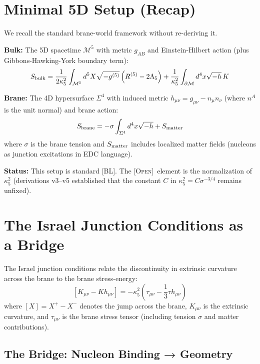 \documentclass[11pt,a4paper]{article}
\newcommand{\BL}{\textsc{[BL]}}
\newcommand{\Open}{\textsc{[Open]}}
\begin{document}
\section{Minimal 5D Setup (Recap)}

We recall the standard brane-world framework without re-deriving it.

\textbf{Bulk:} The 5D spacetime $\mathcal{M}^5$ with metric $g_{AB}$ and
Einstein-Hilbert action (plus Gibbons-Hawking-York boundary term):
\[
S_{\rm bulk} = \frac{1}{2\kappa_5^2} \int_{\mathcal{M}^5} d^5X \sqrt{-g^{(5)}}
\left( R^{(5)} - 2\Lambda_5 \right)
+ \frac{1}{\kappa_5^2} \int_{\partial\mathcal{M}} d^4x \sqrt{-h}\, K
\]

\textbf{Brane:} The 4D hypersurface $\Sigma^4$ with induced metric
$h_{\mu\nu} = g_{\mu\nu} - n_\mu n_\nu$ (where $n^A$ is the unit normal)
and brane action:
\[
S_{\rm brane} = -\sigma \int_{\Sigma^4} d^4x \sqrt{-h} + S_{\rm matter}
\]
where $\sigma$ is the brane tension and $S_{\rm matter}$ includes localized
matter fields (nucleons as junction excitations in EDC language).

\textbf{Status:} This setup is standard \BL. The \Open\ element is the
normalization of $\kappa_5^2$ (derivations v3--v5 established that the
constant $C$ in $\kappa_5^2 = C \sigma^{-3/4}$ remains unfixed).

\section{The Israel Junction Conditions as a Bridge}
\label{sec:israel}

The Israel junction conditions relate the discontinuity in extrinsic
curvature across the brane to the brane stress-energy:
\begin{equation}
\boxed{
\left[ K_{\mu\nu} - K h_{\mu\nu} \right]
= -\kappa_5^2 \left( \tau_{\mu\nu} - \frac{1}{3} \tau h_{\mu\nu} \right)
}
\label{eq:israel}
\end{equation}
where $[X] = X^+ - X^-$ denotes the jump across the brane, $K_{\mu\nu}$
is the extrinsic curvature, and $\tau_{\mu\nu}$ is the brane stress tensor
(including tension $\sigma$ and matter contributions).

\subsection{The Bridge: Nucleon Binding → Geometry}
\end{document}
